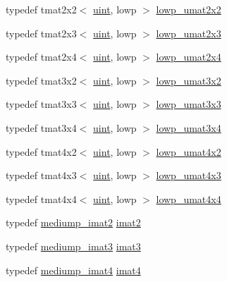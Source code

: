 \begin{DoxyCompactItemize}
typedef tmat2x2$<$ \hyperlink{stb__image_8c_a91ad9478d81a7aaf2593e8d9c3d06a14}{uint}, lowp $>$ \hyperlink{group__gtc__matrix__integer_ga13b2812e9b0af47e0f498391383d145a}{lowp\+\_\+umat2x2}
\item 
typedef tmat2x3$<$ \hyperlink{stb__image_8c_a91ad9478d81a7aaf2593e8d9c3d06a14}{uint}, lowp $>$ \hyperlink{group__gtc__matrix__integer_ga3af254ecb450000314422b1730afacc0}{lowp\+\_\+umat2x3}
\item 
typedef tmat2x4$<$ \hyperlink{stb__image_8c_a91ad9478d81a7aaf2593e8d9c3d06a14}{uint}, lowp $>$ \hyperlink{group__gtc__matrix__integer_gad5e8f08c103d5dd33767e31938357aa6}{lowp\+\_\+umat2x4}
\item 
typedef tmat3x2$<$ \hyperlink{stb__image_8c_a91ad9478d81a7aaf2593e8d9c3d06a14}{uint}, lowp $>$ \hyperlink{group__gtc__matrix__integer_ga3ea8482ddaa10befe8dc2d681d86bb59}{lowp\+\_\+umat3x2}
\item 
typedef tmat3x3$<$ \hyperlink{stb__image_8c_a91ad9478d81a7aaf2593e8d9c3d06a14}{uint}, lowp $>$ \hyperlink{group__gtc__matrix__integer_gab27a50de8b11ec09b2f5cf1cf4c1a062}{lowp\+\_\+umat3x3}
\item 
typedef tmat3x4$<$ \hyperlink{stb__image_8c_a91ad9478d81a7aaf2593e8d9c3d06a14}{uint}, lowp $>$ \hyperlink{group__gtc__matrix__integer_ga2ed807c71afb8c0f8742bb03e9f71829}{lowp\+\_\+umat3x4}
\item 
typedef tmat4x2$<$ \hyperlink{stb__image_8c_a91ad9478d81a7aaf2593e8d9c3d06a14}{uint}, lowp $>$ \hyperlink{group__gtc__matrix__integer_ga5f4e6bb892b20b532bd9caa9aee120b9}{lowp\+\_\+umat4x2}
\item 
typedef tmat4x3$<$ \hyperlink{stb__image_8c_a91ad9478d81a7aaf2593e8d9c3d06a14}{uint}, lowp $>$ \hyperlink{group__gtc__matrix__integer_gae94cb13770f09d0a086e6fb627f47b84}{lowp\+\_\+umat4x3}
\item 
typedef tmat4x4$<$ \hyperlink{stb__image_8c_a91ad9478d81a7aaf2593e8d9c3d06a14}{uint}, lowp $>$ \hyperlink{group__gtc__matrix__integer_ga6ec13ea43b4328e29219f8515c188997}{lowp\+\_\+umat4x4}
\item 
typedef \hyperlink{group__gtc__matrix__integer_gae812330b83568359273b6ec96b002863}{mediump\+\_\+imat2} \hyperlink{group__gtc__matrix__integer_ga77a581b3366fb63fc72f8f20830003e0}{imat2}
\item 
typedef \hyperlink{group__gtc__matrix__integer_gab033bd6a2bfebb1aa35d458c6f077ccb}{mediump\+\_\+imat3} \hyperlink{group__gtc__matrix__integer_ga45481922dd07a3a8e23758286311ee97}{imat3}
\item 
typedef \hyperlink{group__gtc__matrix__integer_ga680c97868de08658ca4924718d951def}{mediump\+\_\+imat4} \hyperlink{group__gtc__matrix__integer_ga40fc5c5e0b07543497aa1c314891544a}{imat4}

\end{DoxyCompactItemize}
